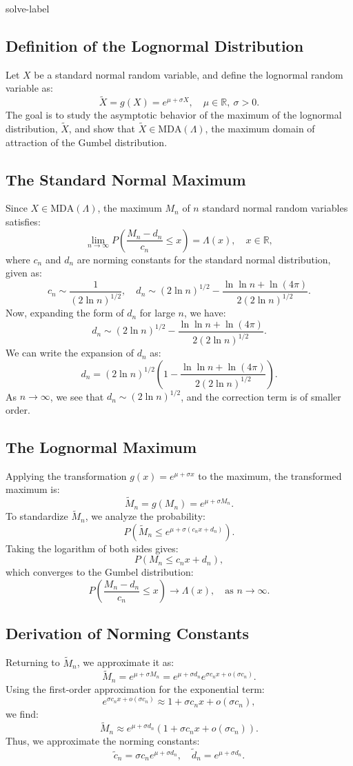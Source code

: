 	\begin{solve}{}{solve-label}
	\subsection*{Definition of the Lognormal Distribution}
Let $X$ be a standard normal random variable, and define the lognormal random variable as:
\[
\tilde{X} = g(X) = e^{\mu + \sigma X}, \quad \mu \in \mathbb{R}, \ \sigma > 0.
\]
The goal is to study the asymptotic behavior of the maximum of the lognormal distribution, $\tilde{X}$, and show that $\tilde{X} \in \text{MDA}(\Lambda)$, the maximum domain of attraction of the Gumbel distribution.

\subsection*{The Standard Normal Maximum}
Since $X \in \text{MDA}(\Lambda)$, the maximum $M_n$ of $n$ standard normal random variables satisfies:
\[
\lim_{n \to \infty} P\left( \frac{M_n - d_n}{c_n} \leq x \right) = \Lambda(x), \quad x \in \mathbb{R},
\]
where $c_n$ and $d_n$ are norming constants for the standard normal distribution, given as:
\[
c_n \sim \frac{1}{(2 \ln n)^{1/2}}, \quad d_n \sim (2 \ln n)^{1/2} - \frac{\ln \ln n + \ln(4\pi)}{2(2 \ln n)^{1/2}}.
\]
Now, expanding the form of $d_n$ for large $n$, we have:
\[
d_n \sim (2 \ln n)^{1/2} - \frac{\ln \ln n + \ln(4\pi)}{2(2 \ln n)^{1/2}}.
\]
We can write the expansion of $d_n$ as:
\[
d_n = (2 \ln n)^{1/2} \left( 1 - \frac{\ln \ln n + \ln(4\pi)}{2 (2 \ln n)^{1/2}} \right).
\]
As $n \to \infty$, we see that $d_n \sim (2 \ln n)^{1/2}$, and the correction term is of smaller order.

\subsection*{The Lognormal Maximum}
Applying the transformation $g(x) = e^{\mu + \sigma x}$ to the maximum, the transformed maximum is:
\[
\tilde{M}_n = g(M_n) = e^{\mu + \sigma M_n}.
\]
To standardize $\tilde{M}_n$, we analyze the probability:
\[
P\left( \tilde{M}_n \leq e^{\mu + \sigma (c_n x + d_n)} \right).
\]
Taking the logarithm of both sides gives:
\[
P\left( M_n \leq c_n x + d_n \right),
\]
which converges to the Gumbel distribution:
\[
P\left( \frac{M_n - d_n}{c_n} \leq x \right) \to \Lambda(x), \quad \text{as } n \to \infty.
\]

\subsection*{Derivation of Norming Constants}
Returning to $\tilde{M}_n$, we approximate it as:
\[
\tilde{M}_n = e^{\mu + \sigma M_n} = e^{\mu + \sigma d_n} e^{\sigma c_n x + o(\sigma c_n)}.
\]
Using the first-order approximation for the exponential term:
\[
e^{\sigma c_n x + o(\sigma c_n)} \approx 1 + \sigma c_n x + o(\sigma c_n),
\]
we find:
\[
\tilde{M}_n \approx e^{\mu + \sigma d_n} \left( 1 + \sigma c_n x + o(\sigma c_n) \right).
\]
Thus, we approximate the norming constants:
\[
\tilde{c}_n = \sigma c_n e^{\mu + \sigma d_n}, \quad \tilde{d}_n = e^{\mu + \sigma d_n}.
\]


\end{solve}
